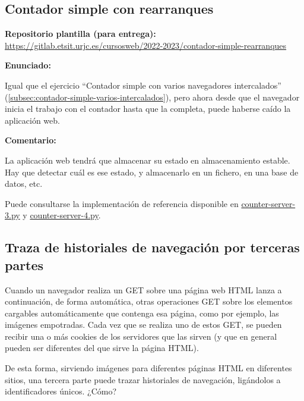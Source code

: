 \subsection{Contador simple con rearranques}
\label{subsec:contador-simple-rearranques}

\textbf{Repositorio plantilla (para entrega):} \\
\url{https://gitlab.etsit.urjc.es/cursosweb/2022-2023/contador-simple-rearranques}

\textbf{Enunciado:}

Igual que el ejercicio ``Contador simple con varios navegadores intercalados'' (\ref{subsec:contador-simple-varios-intercalados}), pero ahora desde que el navegador inicia el trabajo con el contador hasta que la completa, puede haberse caído la aplicación web.

\textbf{Comentario:}

La aplicación web tendrá que  almacenar su estado en almacenamiento estable. Hay que detectar cuál es ese estado, y almacenarlo en  un fichero, en  una base de datos, etc.

Puede consultarse la implementación de referencia disponible en
\href{https://github.com/CursosWeb/Code/blob/master/Python-Web/counter/counter-server-3.py}{counter-server-3.py} y
\href{https://github.com/CursosWeb/Code/blob/master/Python-Web/counter/counter-server-4.py}{counter-server-4.py}.


\subsection{Traza de historiales de navegación por terceras partes}
\label{subsec:navegacion-terceras-partes}

Cuando un navegador realiza un GET sobre una página web HTML lanza a continuación, de forma automática, otras operaciones GET sobre los elementos cargables automáticamente que contenga esa página, como por ejemplo, las imágenes empotradas. Cada vez que se realiza uno de estos GET, se pueden recibir una o más cookies de los servidores que las sirven (y que en general pueden ser diferentes del que sirve la página HTML).

De esta forma, sirviendo imágenes para diferentes páginas HTML en diferentes sitios, una tercera parte puede trazar historiales de navegación, ligándolos a identificadores únicos. ¿Cómo?

